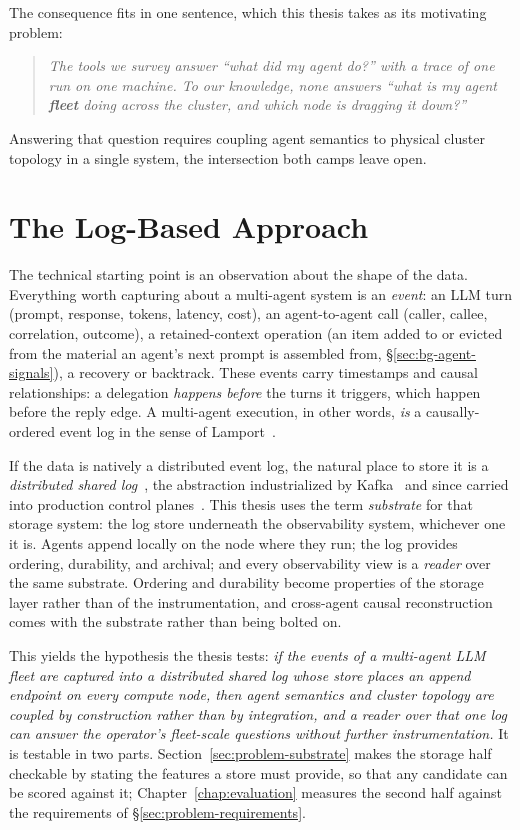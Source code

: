 The consequence fits in one sentence, which this thesis takes as its
motivating problem:

\begin{quote}
\emph{The tools we survey answer ``what did my agent do?'' with a trace
of one run on one machine. To our knowledge, none answers ``what is
my agent \textbf{fleet} doing across the cluster, and which node is
dragging it down?''}
\end{quote}

Answering that question requires coupling agent semantics to physical
cluster topology in a single system, the intersection both camps leave
open.

\section{The Log-Based Approach}
\label{sec:intro-insight}

The technical starting point is an observation about the shape
of the data. Everything worth capturing about a multi-agent system is an
\emph{event}: an LLM turn (prompt, response, tokens, latency, cost), an
agent-to-agent call (caller, callee, correlation, outcome), a
retained-context operation (an item added to or evicted from the material
an agent's next prompt is assembled from, \S\ref{sec:bg-agent-signals}), a
recovery or backtrack. These events carry timestamps and causal
relationships: a delegation \emph{happens before} the turns it triggers,
which happen before the reply edge. A multi-agent execution, in other words,
\emph{is} a causally-ordered event log in the sense of
Lamport~\cite{lamport1978time}.

If the data is natively a distributed event log, the natural place to store
it is a \emph{distributed shared log}~\cite{balakrishnan2012corfu,
kreps2013log}, the abstraction industrialized by Kafka~\cite{kreps2011kafka}
and since carried into production control planes~\cite{balakrishnan2020delos}.
This thesis uses the term \emph{substrate} for that storage
system: the log store underneath the observability system, whichever one it
is. Agents append locally on the node where they run; the log
provides ordering, durability, and archival; and every observability view is
a \emph{reader} over the same substrate. Ordering and durability become
properties of the storage layer rather than of the instrumentation, and
cross-agent causal reconstruction comes with the substrate rather than being
bolted on.

This yields the hypothesis the thesis tests: \emph{if the events of a
multi-agent LLM fleet are captured into a distributed shared log whose store
places an append endpoint on every compute node, then agent semantics and
cluster topology are coupled by construction rather than by integration, and
a reader over that one log can answer the operator's fleet-scale questions
without further instrumentation.} It is testable in two parts.
Section~\ref{sec:problem-substrate} makes the storage half checkable by
stating the features a store must provide, so that any candidate can be
scored against it; Chapter~\ref{chap:evaluation} measures the second half
against the requirements of \S\ref{sec:problem-requirements}.

